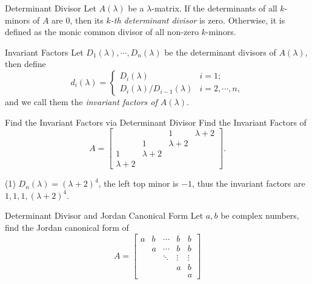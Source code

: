 \begin{definition}{Determinant Divisor}{}
  Let $A(\lambda)$ be a $\lambda$-matrix. If the determinants of all $k$-minors
  of $A$ are $0$, then its \emph{$k$-th determinant divisor} is zero.
  Otherwise, it is defined as the monic common divisor of all non-zero $k$-minors.
\end{definition}

\begin{definition}{Invariant Factors}{}
  Let $D_1(\lambda), \cdots, D_n(\lambda)$ be the determinant divisors of
  $A(\lambda)$,
  then define
  \begin{equation}
    d_i(\lambda) =
    \begin{cases}
      D_i(\lambda) & i = 1;\\
      D_i(\lambda)/D_{i-1}(\lambda) & i = 2,\cdots,n,
    \end{cases}
  \end{equation}
  and we call them the \emph{invariant factors of $A(\lambda)$}.
\end{definition}

\begin{example}{Find the Invariant Factors via Determinant Divisor}{}
  Find the Invariant Factors of
  \begin{equation}
    A = \begin{bmatrix}&&1&\lambda+2\\&1&\lambda+2\\1&\lambda+2\\\lambda+2\end{bmatrix}.
  \end{equation}
\end{example}

\begin{solution}
  (1) $D_n(\lambda) = (\lambda + 2)^4$,
  the left top minor is $-1$, thus the invariant factors are $1, 1, 1, (\lambda
  + 2)^4$.
\end{solution}

\begin{example}{Determinant Divisor and Jordan Canonical Form}{}
  Let $a, b$ be complex numbers, find the Jordan canonical form of
  \begin{equation}
    A =
    \begin{bmatrix}
      a & b & \cdots & b & b\\
        & a & \cdots & b & b\\
        &   & \ddots & \vdots & \vdots\\
        &   &        & a & b\\
        &   &        &   & a
    \end{bmatrix}
  \end{equation}
\end{example}

